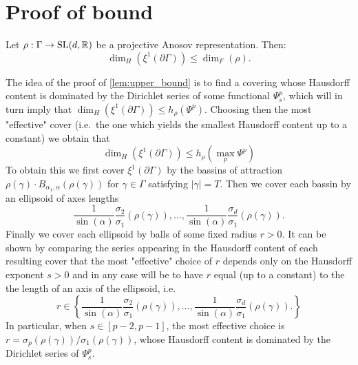 \documentclass{report}
\begin{document}
\section{Proof of bound}
\begin{lemma}\label{lem:upper_bound}
Let $\rho: \Gamma \to \operatorname{{\mathrm{SL}}}(d, \mathbb R)$ be a projective Anosov representation. 
Then:
\[
    \dim_H(\xi^1 (\partial \Gamma) ) \leq \dim_F(\rho).
\]
\end{lemma}
\begin{remark}
    The idea of the proof of \cref{lem:upper_bound} is to find a covering whose Hausdorff content is dominated by the Dirichlet series of some functional $\Psi_s^p$, which will in turn imply that $\dim_H(\xi^1(\partial \Gamma)) \leq h_\rho(\Psi^p) $.
    Choosing then the most "effective" cover (i.e.\ the one which yields the smallest Hausdorff content up to a constant) we obtain that
    \[
        \dim_H(\xi^1(\partial \Gamma)) \leq h_\rho(\max_p \Psi^p)
    \]
    To obtain this we first cover $\xi^1(\partial \Gamma)$ by the bassins of attraction $\rho(\gamma) \cdot B_{\alpha_1, \alpha} (\rho(\gamma))$ for $\gamma \in \Gamma$ satisfying $|\gamma| = T$.
    Then we cover each bassin by an ellipsoid of axes lengths
    \[
        \frac{1}{\sin(\alpha)} \frac{\sigma_2}{\sigma_1}(\rho(\gamma)), \ldots, 
        \frac{1}{\sin(\alpha)} \frac{\sigma_d}{\sigma_1}(\rho(\gamma)).
    \]
    Finally we cover each ellipsoid by balls of some fixed radius $r>0$.
    It can be shown by comparing the series appearing in the Hausdorff content of each resulting cover that the most "effective" choice of $r$ depends only on the Hausdorff exponent $s > 0$ and in any case will be to have $r$ equal (up to a constant) to the the length of an axis of the ellipsoid, i.e.\
    \[
        r \in \left\{
            \frac{1}{\sin(\alpha)} \frac{\sigma_2}{\sigma_1}(\rho(\gamma)), \ldots, 
            \frac{1}{\sin(\alpha)} \frac{\sigma_d}{\sigma_1}(\rho(\gamma)).    
        \right\}
    \]
    In particular, when $s \in [p-2, p-1]$, the most effective choice is $r = \sigma_p(\rho(\gamma))/\sigma_1(\rho(\gamma))$, whose Hausdorff content is dominated by the Dirichlet series of $\Psi_s^p$.
\end{remark}
\end{document}
